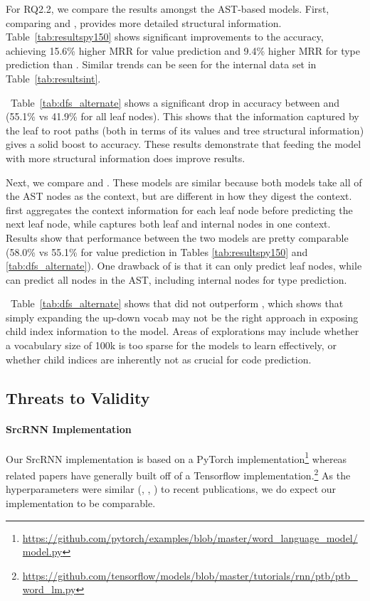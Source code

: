 \documentclass[nonacm, sigconf]{acmart}
\newcommand{\tabref}[1]{Table~\ref{#1}}
\begin{document}
For RQ2.2, we compare the results amongst the AST-based models. 
First, comparing \DFS and \TreeRel, \TreeRel provides more detailed structural information. \tabref{tab:resultspy150} shows significant improvements to the accuracy, achieving 15.6\% higher MRR for value prediction and 9.4\% higher MRR for type prediction than \DFS. Similar trends can be seen for the internal data set in \tabref{tab:resultsint}. 

~\tabref{tab:dfs_alternate} shows a significant drop in accuracy between \RootPath and \LeafTokens (55.1\% vs 41.9\% for all leaf nodes). This shows that the information captured by the leaf to root paths (both in terms of its values and tree structural information) gives a solid boost to accuracy. These results demonstrate that feeding the model with more structural information does improve results.

Next, we compare \RootPath and \DFS. These models are similar because both models take all of the AST nodes as the context, but are different in how they digest the context. \RootPath first aggregates the context information for each leaf node before predicting the next leaf node, while \DFS captures both leaf and internal nodes in one context. Results show that performance between the two models are pretty comparable (58.0\% vs 55.1\% for value prediction in Tables \ref{tab:resultspy150} and \ref{tab:dfs_alternate}). One drawback of \RootPath is that it can only predict leaf nodes, while \DFS  can predict all nodes in the AST, including internal nodes for type prediction.

~\tabref{tab:dfs_alternate} shows that \TreeReli did not outperform \TreeRel, which shows that simply expanding the up-down vocab may not be the right approach in exposing child index information to the model. Areas of explorations may include whether a vocabulary size of 100k is too sparse for the models to learn effectively, or whether child indices are inherently not as crucial for code prediction.
 
\subsection{Threats to Validity}
\label{sec:threats}

\paragraph{SrcRNN Implementation}
Our SrcRNN implementation is based on a PyTorch implementation\footnote{ \url{https://github.com/pytorch/examples/blob/master/word\_language\_model/model.py}} whereas related papers have generally built off of a Tensorflow implementation.\footnote{\url{https://github.com/tensorflow/models/blob/master/tutorials/rnn/ptb/ptb\_word\_lm.py}}  As the hyperparameters were similar (, , ) to recent publications, we do expect our implementation to be comparable.  
\end{document}
